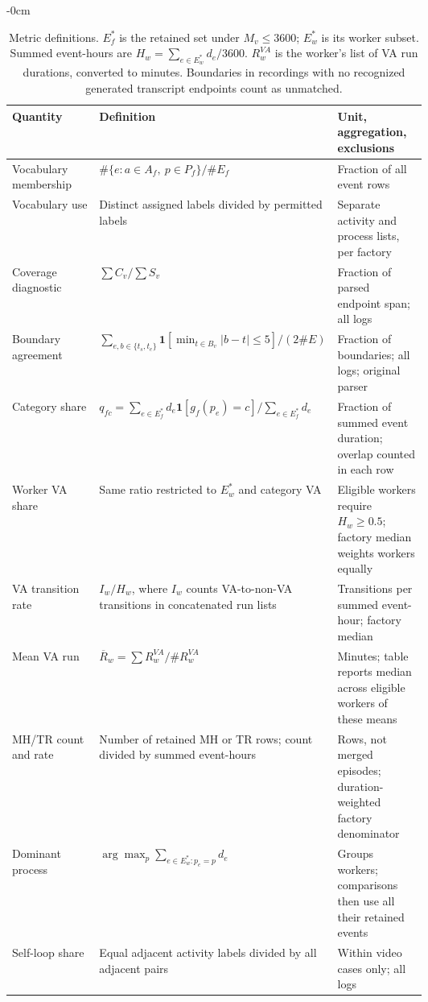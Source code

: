 \FloatBarrier
\begin{table}[!t]\begin{adjustwidth}{-\extralength}{0cm}
\caption{Metric definitions. $E_f^*$ is the retained set under $M_v\leq3600$; $E_w^*$ is its worker subset. Summed event-hours are $H_w=\sum_{e\in E_w^*}d_e/3600$. $R_w^{VA}$ is the worker's list of VA run durations, converted to minutes. Boundaries in recordings with no recognized generated transcript endpoints count as unmatched.}
\label{tab:metrics}\footnotesize
\begin{tabularx}{\linewidth}{@{}p{0.21\linewidth}p{0.39\linewidth}L@{}}\toprule
Quantity & Definition & Unit, aggregation, exclusions \\\midrule
Vocabulary membership & $\#\{e:a\in A_f,\ p\in P_f\}/\#E_f$ & Fraction of all event rows \\
Vocabulary use & Distinct assigned labels divided by permitted labels & Separate activity and process lists, per factory \\
Coverage diagnostic & $\sum C_v/\sum S_v$ & Fraction of parsed endpoint span; all logs \\
Boundary agreement & $\sum_{e,b\in\{t_s,t_e\}}\mathbf{1}[\min_{t\in B_v}|b-t|\leq5]/(2\#E)$ & Fraction of boundaries; all logs; original parser \\
Category share & $q_{fc}=\sum_{e\in E_f^*}d_e\mathbf{1}[g_f(p_e)=c]/\sum_{e\in E_f^*}d_e$ & Fraction of summed event duration; overlap counted in each row \\
Worker VA share & Same ratio restricted to $E_w^*$ and category VA & Eligible workers require $H_w\geq0.5$; factory median weights workers equally \\
VA transition rate & $I_w/H_w$, where $I_w$ counts VA-to-non-VA transitions in concatenated run lists & Transitions per summed event-hour; factory median \\
Mean VA run & $\overline R_w=\sum R_w^{VA}/\#R_w^{VA}$ & Minutes; table reports median across eligible workers of these means \\
MH/TR count and rate & Number of retained MH or TR rows; count divided by summed event-hours & Rows, not merged episodes; duration-weighted factory denominator \\
Dominant process & $\arg\max_p\sum_{e\in E_w^*:p_e=p}d_e$ & Groups workers; comparisons then use all their retained events \\
Self-loop share & Equal adjacent activity labels divided by all adjacent pairs & Within video cases only; all logs \\
\bottomrule\end{tabularx}
\end{adjustwidth}\end{table}

